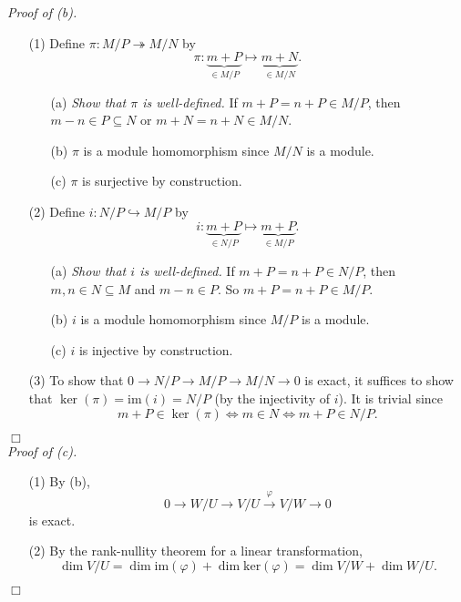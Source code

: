 \documentclass{article}
\begin{document}
\emph{Proof of (b).}
\begin{enumerate}
\item[(1)]
  Define $\pi: M/P \twoheadrightarrow M/N$ by
  \[
    \pi: \underbrace{m + P}_{\in M/P} \mapsto \underbrace{m + N}_{\in M/N}.
  \]
  \begin{enumerate}
  \item[(a)]
    \emph{Show that $\pi$ is well-defined.}
    If $m + P = n + P \in M/P$, then $m - n \in P \subseteq N$ or $m + N = n + N \in M/N$.

  \item[(b)]
    $\pi$ is a module homomorphism since $M/N$ is a module.

  \item[(c)]
    $\pi$ is surjective by construction.
  \end{enumerate}

\item[(2)]
  Define $i: N/P \hookrightarrow M/P$ by
  \[
    i: \underbrace{m + P}_{\in N/P} \mapsto \underbrace{m + P}_{\in M/P}.
  \]
  \begin{enumerate}
  \item[(a)]
    \emph{Show that $i$ is well-defined.}
    If $m + P = n + P \in N/P$, then $m, n \in N \subseteq M$ and $m - n \in P$.
    So $m + P = n + P \in M/P$.

  \item[(b)]
    $i$ is a module homomorphism since $M/P$ is a module.

  \item[(c)]
    $i$ is injective by construction.
  \end{enumerate}

\item[(3)]
  To show that $0 \to N/P \to M/P \to M/N \to 0$ is exact,
  it suffices to show that
  $\ker(\pi) = \mathrm{im}(i) = N/P$ (by the injectivity of $i$).
  It is trivial since
  \[
    m + P \in \ker(\pi)
    \Longleftrightarrow m \in N
    \Longleftrightarrow m + P \in N/P.
  \]
\end{enumerate}
$\Box$ \\



\emph{Proof of (c).}
\begin{enumerate}
\item[(1)]
  By (b),
  \[
    0 \to W/U \to V/U \xrightarrow{\varphi} V/W \to 0
  \]
  is exact.

\item[(2)]
  By the rank-nullity theorem for a linear transformation,
  \[
    \dim V/U
    = \dim \mathrm{im}(\varphi) + \dim \mathrm{ker}(\varphi)
    = \dim V/W + \dim W/U.
  \]
\end{enumerate}
$\Box$ \\
\end{document}
